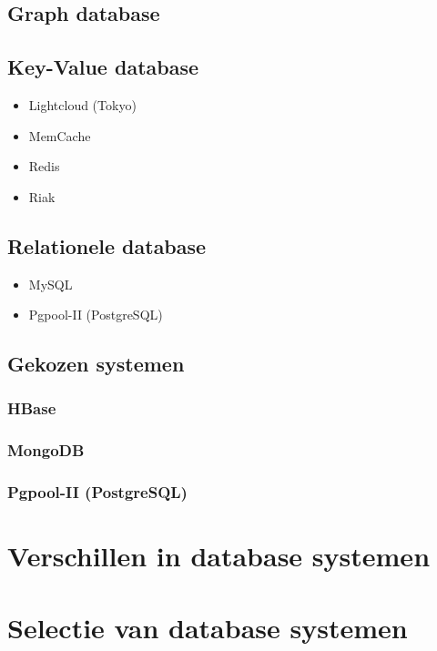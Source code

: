 \subsection{Graph database}

\subsection{Key-Value database}
\begin{itemize}
\item Lightcloud (Tokyo)
\item MemCache
\item Redis
\item Riak
\end{itemize}

\subsection{Relationele database}
\begin{itemize}
\item MySQL
\item Pgpool-II (PostgreSQL)
\end{itemize}

\subsection{Gekozen systemen}
\subsubsection{HBase}
\subsubsection{MongoDB}
\subsubsection{Pgpool-II (PostgreSQL)}

\section{Verschillen in database systemen}

\section{Selectie van database systemen}

